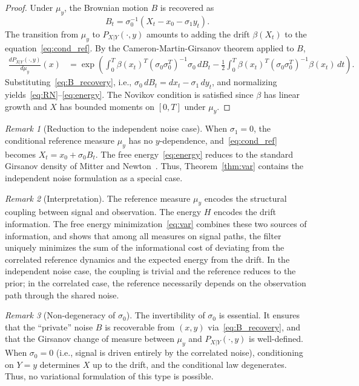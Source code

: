 \documentclass[12pt]{amsart}
\theoremstyle{definition}
\theoremstyle{remark}
\newtheorem{remark}{Remark}
\begin{document}
\begin{proof}
    Under $\mu_y$, the Brownian motion $B$ is recovered as
    \begin{equation}\label{eq:B_recovery}
        B_t = \sigma_0^{-1}(X_t - x_0 - \sigma_1 y_t).
    \end{equation}
    The transition from $\mu_y$ to $P_{X|Y}(\cdot, y)$ amounts to adding the drift $\beta(X_t)$ to the equation~\eqref{eq:cond_ref}. By the Cameron-Martin-Girsanov theorem applied to $B$,
    \begin{align*}
        \frac{dP_{X|Y}(\cdot, y)}{d\mu_y}(x) &= \exp\!\left(\int_0^T \beta(x_t)^T (\sigma_0 \sigma_0^T)^{-1} \sigma_0 \, dB_t - \frac{1}{2}\int_0^T \beta(x_t)^T (\sigma_0 \sigma_0^T)^{-1} \beta(x_t) \, dt \right).
    \end{align*}
    Substituting~\eqref{eq:B_recovery}, i.e., $\sigma_0 \, dB_t = dx_t - \sigma_1 \, dy_t$, and normalizing yields~\eqref{eq:RN}--\eqref{eq:energy}. The Novikov condition is satisfied since $\beta$ has linear growth and $X$ has bounded moments on $[0,T]$ under $\mu_y$.
\end{proof}

\begin{remark}[Reduction to the independent noise case]
    When $\sigma_1 = 0$, the conditional reference measure $\mu_y$ has no $y$-dependence, and~\eqref{eq:cond_ref} becomes $X_t = x_0 + \sigma_0 B_t$. The free energy~\eqref{eq:energy} reduces to the standard Girsanov density of Mitter and Newton~\cite{mitter2003variational}. Thus, Theorem~\ref{thm:var} contains the independent noise formulation as a special case.
\end{remark}

\begin{remark}[Interpretation]
    The reference measure $\mu_y$ encodes the structural coupling between signal and observation.
    The energy $H$ encodes the drift information. The free energy minimization~\eqref{eq:var} combines these two sources of information, and shows that among all measures on signal paths, the filter uniquely minimizes the sum of the informational cost of deviating from the correlated reference dynamics and the expected energy from the drift. In the independent noise case, the coupling is trivial and the reference reduces to the prior; in the correlated case, the reference necessarily depends on the observation path through the shared noise.
\end{remark}

\begin{remark}[Non-degeneracy of $\sigma_0$]
    The invertibility of $\sigma_0$ is essential. It ensures that the ``private'' noise $B$ is recoverable from $(x, y)$ via~\eqref{eq:B_recovery}, and that the Girsanov change of measure between $\mu_y$ and $P_{X|Y}(\cdot, y)$ is well-defined. When $\sigma_0 = 0$ (i.e., signal is driven entirely by the correlated noise), conditioning on $Y = y$ determines $X$ up to the drift, and the conditional law degenerates. Thus, no variational formulation of this type is possible.
\end{remark}
\end{document}
